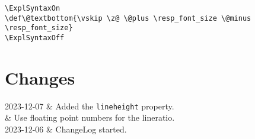 \documentclass{ltxdoc}
\makeatletter
\newenvironment{changelog}{\longtable{@{} l p{30em}}}{\endlongtable}
\newcommand\change[2]{#1 & #2\\}
\makeatother
\begin{document}
\begin{verbatim}
\ExplSyntaxOn
\def\@textbottom{\vskip \z@ \@plus \resp_font_size \@minus \resp_font_size}
\ExplSyntaxOff
\end{verbatim}

\section{Changes}

\begin{changelog}
  \change{2023-12-07}{Added the \texttt{lineheight} property.}
  \change{}{Use floating point numbers for the lineratio.}
  \change{2023-12-06}{ChangeLog started.}
\end{changelog}

\printbibliography
\end{document}
